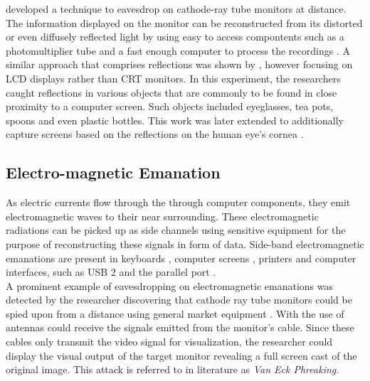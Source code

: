 \citeauthor{1004358} developed a technique to eavesdrop on cathode-ray tube monitors at distance. The information displayed on the monitor can be reconstructed from its distorted or even diffusely reflected light by using easy to access compontents such as a photomultiplier tube and a fast enough computer to process the recordings \cite{1004358}. A similar approach that comprises reflections was shown by \citeauthor{4531151}, however focusing on LCD displays rather than CRT monitors. In this experiment, the researchers caught reflections in various objects that are commonly to be found in close proximity to a computer screen. Such objects included eyeglasses, tea pots, spoons and even plastic bottles. This work was later extended to additionally capture screens based on the reflections on the human eye's cornea \cite{5207653}.

\subsection{Electro-magnetic Emanation}

As electric currents flow through the through computer components, they emit electromagnetic waves to their near surrounding. These electromagnetic radiations can be picked up as side channels using sensitive equipment for the purpose of reconstructing these signals in form of data. 
Side-band electromagnetic emanations are present in keyboards \cite{Vuagnoux:2009:CEE:1855768.1855769}, computer screens \cite{vanEck:1985:ERV:7307.7308,kuhn2004electromagnetic}, printers \cite{przesmycki2014measurement} and computer interfaces, such as USB 2 \cite{nowosielski2014compromising} and the parallel port \cite{serialcablearticle}.\\

A prominent example of eavesdropping on electromagnetic emanations was detected by the researcher \citeauthor{vanEck:1985:ERV:7307.7308} discovering that cathode ray tube monitors could be spied upon from a distance using general market equipment \cite{vanEck:1985:ERV:7307.7308}. With the use of antennas \citeauthor{vanEck:1985:ERV:7307.7308} could receive the signals emitted from the monitor's cable. Since these cables only transmit the video signal for visualization, the researcher could display the visual output of the target monitor revealing a full screen cast of the original image. This attack is referred to in literature as \textit{Van Eck Phreaking}.\\

